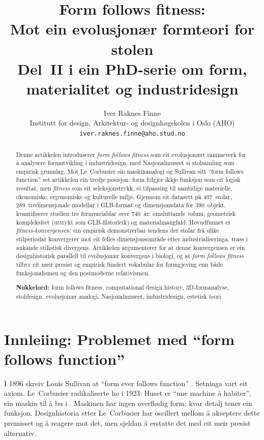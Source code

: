 \documentclass[12pt,a4paper]{article}
\title{Form follows fitness:\\
\large Mot ein evolusjon\ae{}r formteori for stolen\\[0.5em]
\normalsize Del~II i ein PhD-serie om form, materialitet og industridesign}
\author{Iver Raknes Finne\\
\small Institutt for design, Arkitektur- og designh\o{}gskolen i Oslo (AHO)\\
\small\texttt{iver.raknes.finne@aho.stud.no}}
\date{}
\begin{document}
\maketitle

\begin{abstract}
\noindent
Denne artikkelen introduserer \emph{form follows fitness} som eit evolusjon\ae{}rt rammeverk for \aa{} analysere formutvikling i industridesign, med Nasjonalmuseet si stolsamling som empirisk grunnlag. Mot Le~Corbusier sin maskinanalogi og Sullivan sitt ``form follows function'' set artikkelen ein tredje posisjon: form f\o{}lgjer ikkje funksjon som eit logisk resultat, men \emph{fitness} som eit seleksjonstrykk, ei tilpassing til samtidige materielle, \o{}konomiske, ergonomiske og kulturelle milj\o{}. Gjennom eit datasett p\aa{} 407~stolar, 289~tredimensjonale modellar i GLB-format og dimensjonsdata for 390~objekt, kvantifiserer studien tre formvariablar over 740~\aa{}r: omsluttande volum, geometrisk kompleksitet (uttrykt som GLB-filstorleik) og materialmangfald. Hovudfunnet er \emph{fitness-konvergensen}: ein empirisk demonstrerbar tendens der stolar fr\aa{} ulike stilperiodar konvergerer mot eit felles dimensjonsomr\aa{}de etter industrialiseringa, trass i aukande stilistisk divergens. Artikkelen argumenterer for at denne konvergensen er ein designhistorisk parallell til evolusjon\ae{}r konvergens i biologi, og at \emph{form follows fitness} tilbyr eit meir presist og empirisk fundert vokabular for formgjeving enn b\aa{}de funksjonalismen og den postmoderne relativismen.

\medskip
\noindent\textbf{N\o{}kkelord:} form follows fitness, computational design history, 3D-formanalyse, stoldesign, evolusjon\ae{}r analogi, Nasjonalmuseet, industridesign, estetisk teori
\end{abstract}

\section{Innleiing: Problemet med ``form follows function''}

I 1896 skreiv Louis Sullivan at ``form ever follows function'' \citep{sullivan1896}. Setninga vart eit axiom. Le~Corbusier radikaliserte ho i 1923: Huset er ``une machine \`a habiter'', ein maskin til \aa{} bu i \citep{corbusier1923}. Maskinen har ingen overfl\o{}dig form; kvar detalj tener ein funksjon. Designhistoria etter Le~Corbusier har oscillert mellom \aa{} akseptere dette premisset og \aa{} reagere mot det, men sjeldan \aa{} erstatte det med eit meir presist alternativ.
\end{document}
